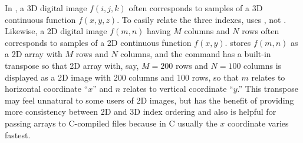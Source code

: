 In \irt,
a 3D digital image $f(i,j,k)$
often corresponds to samples
of a 3D continuous function
$f(x,y,z)$.
To easily relate the three indexes,
\irt uses , not .
Likewise,
a 2D digital image $f(m,n)$
having $M$ columns and $N$ rows
often corresponds to samples
of a 2D continuous function
$f(x,y)$.
\irt stores $f(m,n)$
as a 2D array
with $M$ rows and $N$ columns,
and the  command
has a built-in transpose
so that 2D array
with, say, $M=200$ rows and $N=100$ columns
is displayed as a 2D image
with 200 columns and 100 rows,
so that $m$ relates to horizontal coordinate ``$x$''
and $n$ relates to vertical coordinate ``$y$.''
This transpose may feel unnatural to some users of 2D images,
but has the benefit of providing more consistency
between 2D and 3D index ordering
and also is helpful
for passing \matlab arrays to C-compiled  files
because in C usually the $x$ coordinate varies fastest.
